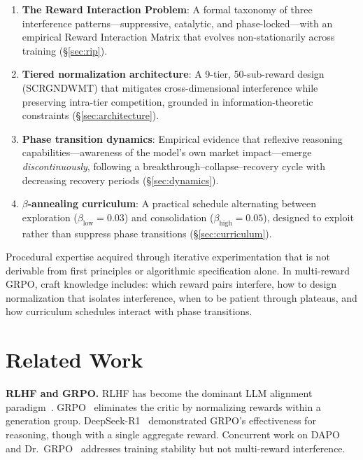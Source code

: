 \documentclass[sigconf]{acmart}
\begin{document}
\begin{enumerate}
    \item \textbf{The Reward Interaction Problem}: A formal taxonomy of three interference patterns---suppressive, catalytic, and phase-locked---with an empirical Reward Interaction Matrix that evolves non-stationarily across training (\S\ref{sec:rip}).
    
    \item \textbf{Tiered normalization architecture}: A 9-tier, 50-sub-reward design (SCRGNDWMT) that mitigates cross-dimensional interference while preserving intra-tier competition, grounded in information-theoretic constraints (\S\ref{sec:architecture}).
    
    \item \textbf{Phase transition dynamics}: Empirical evidence that reflexive reasoning capabilities---awareness of the model's own market impact---emerge \textit{discontinuously}, following a breakthrough--collapse--recovery cycle with decreasing recovery periods (\S\ref{sec:dynamics}).
    
    \item \textbf{$\beta$-annealing curriculum}: A practical schedule alternating between exploration ($\beta_{\text{low}}=0.03$) and consolidation ($\beta_{\text{high}}=0.05$), designed to exploit rather than suppress phase transitions (\S\ref{sec:curriculum}).
\end{enumerate}

\begin{definition}
\label{def:craft}
Procedural expertise acquired through iterative experimentation that is not derivable from first principles or algorithmic specification alone. In multi-reward GRPO, craft knowledge includes: which reward pairs interfere, how to design normalization that isolates interference, when to be patient through plateaus, and how curriculum schedules interact with phase transitions.
\end{definition}

\section{Related Work}
\label{sec:related}

\textbf{RLHF and GRPO.}
RLHF has become the dominant LLM alignment paradigm~\cite{ouyang2022training, bai2022constitutional}. GRPO~\cite{shao2024deepseekmath} eliminates the critic by normalizing rewards within a generation group. DeepSeek-R1~\cite{deepseekr1} demonstrated GRPO's effectiveness for reasoning, though with a single aggregate reward. Concurrent work on DAPO~\cite{dapo2025} and Dr.~GRPO~\cite{liu2025drgrpo} addresses training stability but not multi-reward interference.
\end{document}
